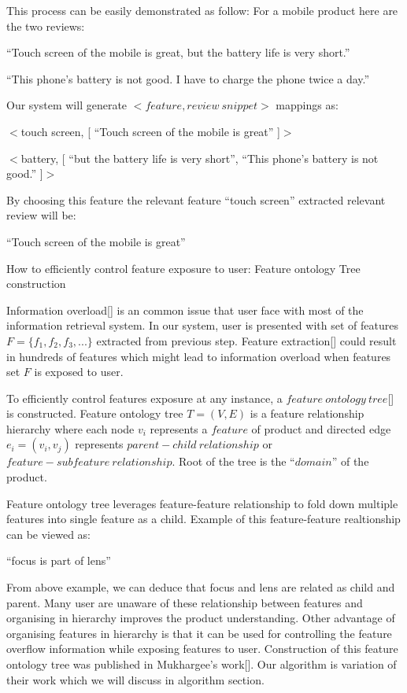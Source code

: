 This process can be easily demonstrated as follow: For a mobile product here are the two reviews:

``Touch screen of the mobile is great, but the battery life is very short.''

``This phone's battery is not good. I have to charge the phone twice a day.''

Our system will generate $<feature, review\ snippet>$ mappings as:

$<$touch screen, [ ``Touch screen of the mobile is great'' ]$>$

$<$battery, [ ``but the battery life is very short'', ``This phone's battery is not good.'' ]$>$

By choosing this feature the relevant feature ``touch screen'' extracted relevant review will be:

``Touch screen of the mobile is great''


\begin{problem}
	How to efficiently control feature exposure to user: Feature ontology Tree construction 
\end{problem}
Information overload[] is an common issue that user face with most of the information retrieval system. In our system, user is presented with set of features $F = \{f_{1},f_{2},f_{3},...\}$ extracted from previous step. Feature extraction[] could result in hundreds of features which might lead to information overload when features set $F$ is exposed to user.    

To efficiently control features exposure at any instance, a $feature\ ontology\ tree$[] is constructed. Feature ontology tree $T=(V,E)$ is a feature relationship hierarchy where each node $v_{i}$ represents a $feature$ of product and directed edge $e_{i}=(v_{i},v_{j})$ represents $parent-child\ relationship$ or $feature-subfeature\ relationship$. Root of the tree is the ``$domain$'' of the product.

Feature ontology tree leverages feature-feature relationship to fold down multiple features into single feature as a child. Example of this feature-feature realtionship can be viewed as:

``focus is part of lens''

From above example, we can deduce that focus and lens are related as child and parent. Many user are unaware of these relationship between features and organising in hierarchy improves the product understanding. Other advantage of organising features in hierarchy is that it can be used for controlling the feature overflow information while exposing features to user. Construction of this feature ontology tree was published in Mukhargee's work[]. Our algorithm is variation of their work which we will discuss in algorithm section.

